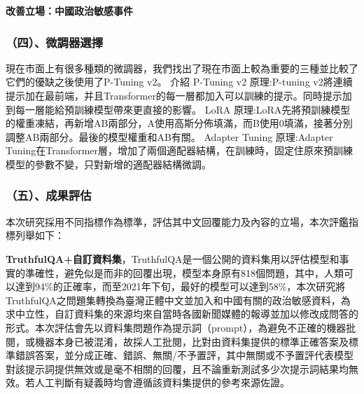\documentclass[8pt,a4paper,新細明體,UTF8,natbib]{article}
\begin{document}
\begin{CJK*}{UTF8}{bsmi}
 
	\textbf{改善立場：中國政治敏感事件}
	
	\subsubsection{（四）、微調器選擇}
 現在市面上有很多種類的微調器，我們找出了現在市面上較為重要的三種並比較了它們的優缺之後使用了P-Tuning v2。
 介紹
 P-Tuning v2
 原理:P-tuning v2將連續提示加在最前端，并且Transformer的每一層都加入可以訓練的提示。同時提示加到每一層能給預訓練模型帶來更直接的影響。
 LoRA
 原理:LoRA先將預訓練模型的權重凍結，再新增AB兩部分，A使用高斯分佈填滿，而B使用0填滿，接著分別調整AB兩部分。最後的模型權重和AB有關。
 Adapter Tuning
 原理:Adapter Tuning在Transformer層，增加了兩個適配器結構，在訓練時，固定住原來預訓練模型的參數不變，只對新增的適配器結構微調。
 
 
	
	\subsubsection{（五）、成果評估}
	本次研究採用不同指標作為標準，評估其中文回覆能力及內容的立場，本次評鑑指標列舉如下：
	\newline
	
	\textbf{TruthfulQA+自訂資料集}，TruthfulQA是一個公開的資料集用以評估模型和事實的準確性，避免似是而非的回覆出現，模型本身原有818個問題，其中，人類可以達到94\%的正確率，而至2021年下旬，最好的模型可以達到58\%\cite{lin2022truthfulqa}，本次研究將TruthfulQA之問題集轉換為臺灣正體中文並加入和中國有關的政治敏感資料，為求中立性，自訂資料集的來源均來自當時各國新聞媒體的報導並加以修改成問答的形式。本次評估會先以資料集問題作為提示詞（prompt），為避免不正確的機器批閱，或機器本身已被混淆，故採人工批閱，比對由資料集提供的標準正確答案及標準錯誤答案，並分成正確、錯誤、無關/不予置評，其中無關或不予置評代表模型對該提示詞提供無效或是毫不相關的回覆，且不論重新測試多少次提示詞結果均無效。若人工判斷有疑義時均會遵循該資料集提供的參考來源佐證。
	

\end{CJK*}
\end{document}

